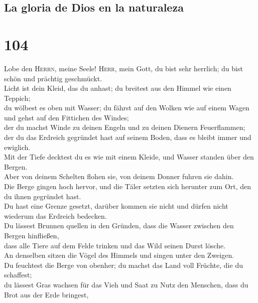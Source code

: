 \hypertarget{la-gloria-de-dios-en-la-naturaleza}{%
\subsection{La gloria de Dios en la
naturaleza}\label{la-gloria-de-dios-en-la-naturaleza}}

\hypertarget{section-103}{%
\section{104}\label{section-103}}

 Lobe den \textsc{Herrn}, meine Seele! \textsc{Herr}, mein
Gott, du bist sehr herrlich; du bist schön und prächtig geschmückt.\\
 Licht ist dein Kleid, das du anhast; du breitest aus den
Himmel wie einen Teppich;\\
 du wölbest es oben mit Wasser; du fährst auf den Wolken
wie auf einem Wagen und gehst auf den Fittichen des Windes;\\
 der du machst Winde zu deinen Engeln und zu deinen
Dienern Feuerflammen;\\
 der du das Erdreich gegründet hast auf seinem Boden, dass
es bleibt immer und ewiglich.\\
 Mit der Tiefe decktest du es wie mit einem Kleide, und
Wasser standen über den Bergen.\\
 Aber von deinem Schelten flohen sie, von deinem Donner
fuhren sie dahin.\\
 Die Berge gingen hoch hervor, und die Täler setzten sich
herunter zum Ort, den du ihnen gegründet hast.\\
 Du hast eine Grenze gesetzt, darüber kommen sie nicht und
dürfen nicht wiederum das Erdreich bedecken.\\
 Du lässest Brunnen quellen in den Gründen, dass die
Wasser zwischen den Bergen hinfließen,\\
 dass alle Tiere auf dem Felde trinken und das Wild
seinen Durst lösche.\\
 An denselben sitzen die Vögel des Himmels und singen
unter den Zweigen.\\
 Du feuchtest die Berge von obenher; du machst das Land
voll Früchte, die du schaffest;\\
 du lässest Gras wachsen für das Vieh und Saat zu Nutz
den Menschen, dass du Brot aus der Erde bringest,\\
